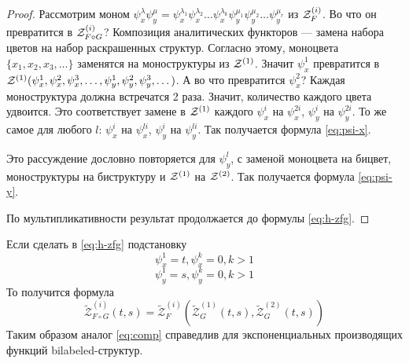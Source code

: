\begin{proof}
Рассмотрим моном $\psi_x^{\lambda}\psi_y^{\mu} =
\psi_x^{\lambda_1}\psi_x^{\lambda_2}\ldots\psi_x^{\lambda_k}\psi_y^{\mu_1}\psi_y^{\mu_2}\ldots\psi_y^{\mu_r}$
из $\mathcal Z^{(i)}_{F}$. Во что он превратится в $\mathcal Z^{(i)}_{F \circ G}$? Композиция
аналитических функторов --- замена набора цветов на набор раскрашенных
структур.
Согласно этому, моноцвета $\{x_1, x_2, x_3, \ldots\}$ заменятся на
моноструктуры из $\mathcal Z^{(1)}$. Значит $\psi_x^1$ превратится в $\mathcal Z^{(1)}(\psi_x^1,
\psi_x^2, \psi_x^3, \dots, \psi_y^1, \psi_y^2, \psi_y^3, \dots)$. А во что
превратится $\psi_x^2$? Каждая моноструктура должна встречатся 2 раза.
Значит, количество каждого цвета удвоится. Это соответствует замене в $\mathcal Z^{(1)}$
каждого $\psi_x^i$ на $\psi_x^{2i}$, $\psi_y^i$ на $\psi_y^{2i}$. То же самое
для любого $l$: $\psi_x^i$ на $\psi_x^{li}$, $\psi_y^i$ на
$\psi_y^{li}$. Так получается формула \ref{eq:psi-x}.

Это рассуждение дословно повторяется для $\psi_y^l$, с заменой моноцвета на
бицвет, моноструктуры на биструктуру и $\mathcal Z^{(1)}$ на $\mathcal Z^{(2)}$. Так получается
формула \ref{eq:psi-y}.

По мультипликативности результат продолжается до формулы \ref{eq:h-zfg}.
\end{proof}

\begin{remark}
Если сделать в \ref{eq:h-zfg} подстановку 
$$
\psi_{x}^1 = t, \psi_{x}^k = 0, k>1
$$
$$
\psi_y^1 = s, \psi_y^k = 0, k>1
$$
То получится формула
$$
\tilde{\mathcal Z}^{(i)}_{F \circ G} (t, s) = 
	\tilde{\mathcal Z}_F^{(i)} (
		\tilde{\mathcal Z}_G^{(1)} (t, s), 
		\tilde{\mathcal Z}_G^{(2)} (t, s))
$$
Таким образом аналог \ref{eq:comp} справедлив для
экспоненциальных производящих функций bilabeled-структур.
\end{remark}

